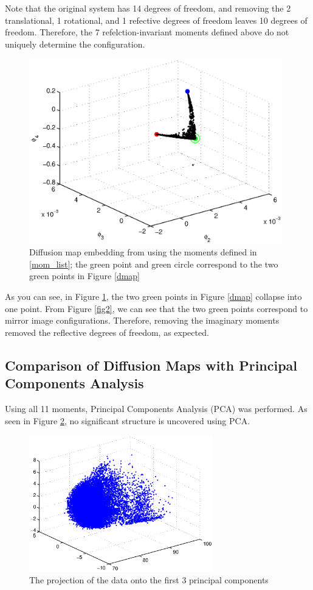 Note that the original system has 14 degrees of freedom, and removing the 2 translational, 1 rotational, and 1 refective degrees of freedom leaves 10 degrees of freedom. Therefore, the 7 refelction-invariant moments defined above do not uniquely determine the configuration. 

\begin{figure}[t]
\includegraphics[width=11cm]{dmap_noreflec.eps}
\caption[Diffusion maps embedding of Lennard-Jones cluster using rotation-invariant moments]{Diffusion map embedding from using the moments defined in \ref{mom_list}; the green point and green circle correspond to the two green points in Figure \ref{dmap}}
\label{dmap_noreflec}
\end{figure}

As you can see, in Figure \ref{dmap_noreflec}, the two green points in Figure \ref{dmap} collapse into one point. From Figure \ref{fig2}, we can see that the two green points correspond to mirror image configurations. Therefore, removing the imaginary moments removed the reflective degrees of freedom, as expected. 

\subsection{Comparison of Diffusion Maps with Principal Components Analysis}
Using all 11 moments, Principal Components Analysis (PCA) was performed. As seen in Figure \ref{PCA}, no significant structure is uncovered using PCA.
\begin{figure}[t]
\includegraphics[width=8cm]{PCA.eps}
\caption[Principal components embedding of Lennard-Jones cluster]{The projection of the data onto the first 3 principal components}
\label{PCA}
\end{figure}

